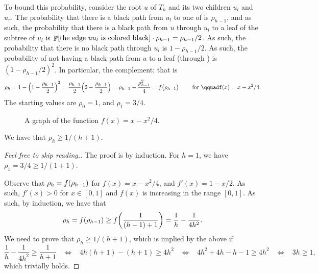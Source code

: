 To bound this probability, consider the root $u$ of $T_h$ and its two
children $u_l$ and $u_r$. The probability that there is a black path
from $u_l$ to one of  is $\rho_{h-1}$, and as such, the
probability that there is a black path from $u$ through $u_l$ to a
leaf of the subtree of $u_l$ is $\Prob{\text{the edge } \MakeSBig u {}
   u_l \text{ is colored black}} \cdot \rho_{h-1} = \rho_{h-1}/2$. As
such, the probability that there is no black path through $u_l$ is
$1-\rho_{h-1}/2$. As such, the probability of not having a black path
from $u$ to a leaf (through ) is
$(1-\rho_{h-1}/2)^2$. In particular,  the
complement; that is
\begin{equation*}
    \rho_h%
    =%
    1 - \pth{1-\frac{\rho_{h-1}}{2}}^2 %
    =%
    \frac{\rho_{h-1}}{2} \pth{2-\frac{\rho_{h-1}}{2}} = \rho_{h-1} -
    \frac{\rho_{h-1}^2}{4} = f \bigl( \rho_{h-1} \bigr)
    \qquad
    \text{ for }
    \qquad%
    f(x) = x -x^2/4.
\end{equation*}
The starting values are $\rho_0 = 1$, and $\rho_1 = 3/4$.

\begin{figure}[h]
    \centerline{%
    }
    \caption{A graph of the function $f(x) = x -x^2/4$.}
\end{figure}

\begin{lemma}
    We have that $\rho_h \geq 1/(h+1)$.
\end{lemma}
\begin{proof}[Feel free to skip reading.]
    The proof is by induction. For $h=1$, we have
    $\rho_1 = 3/4 \geq 1/(1+1)$.
    
    Observe that $\rho_h = f\pth{\rho_{h-1} }$ for $f(x) = x -x^2/4$,
    and $f'(x) = 1-x/2$. As such, $f'(x) > 0$ for $x\in[0,1]$ and
    $f(x)$ is increasing in the range $[0,1]$. As such, by induction,
    we have that
    \begin{equation*}
        \ds \rho_h = f\pth[]{ \rho_{h-1}} \geq f\pth[]{
           \frac{1}{(h-1)+1}} = \frac{1}{h} - \frac{1}{4 h^2}.        
    \end{equation*}
    We need
    to prove that $\rho_h \geq 1/(h+1)$, which is implied by the above
    if
    \begin{equation*}
      \frac{1}{h} - \frac{1}{4 h^2} \geq \frac{1}{h+1}
      \;\;\;\Leftrightarrow \;\;\; 4h(h+1) - (h+1) \geq 4h^2
      \;\;\;\Leftrightarrow \;\;\; 4h^2 +4h - h- 1 \geq 4h^2
      \;\;\;\Leftrightarrow \;\;\; 3h \geq 1,
  \end{equation*}
    which trivially holds.
\end{proof}


